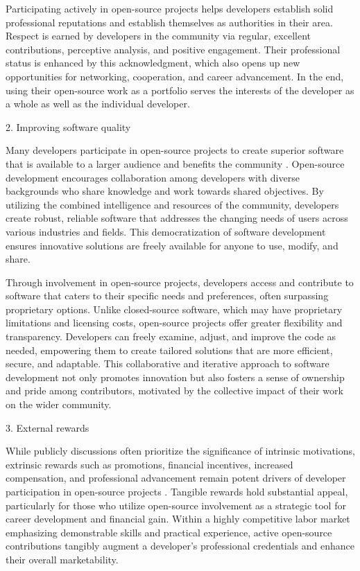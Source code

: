 Participating actively in open-source projects helps developers establish solid professional reputations and establish themselves as authorities in their area. Respect is earned by developers in the community via regular, excellent contributions, perceptive analysis, and positive engagement. Their professional status is enhanced by this acknowledgment, which also opens up new opportunities for networking, cooperation, and career advancement. In the end, using their open-source work as a portfolio serves the interests of the developer as a whole as well as the individual developer.

2. Improving software quality


Many developers participate in open-source projects to create superior software that is available to a larger audience and benefits the community \citep{13li2012leadership,15roberts2006understanding}. Open-source development encourages collaboration among developers with diverse backgrounds who share knowledge and work towards shared objectives. By utilizing the combined intelligence and resources of the community, developers create robust, reliable software that addresses the changing needs of users across various industries and fields. This democratization of software development ensures innovative solutions are freely available for anyone to use, modify, and share.

Through involvement in open-source projects, developers access and contribute to software that caters to their specific needs and preferences, often surpassing proprietary options. Unlike closed-source software, which may have proprietary limitations and licensing costs, open-source projects offer greater flexibility and transparency. Developers can freely examine, adjust, and improve the code as needed, empowering them to create tailored solutions that are more efficient, secure, and adaptable. This collaborative and iterative approach to software development not only promotes innovation but also fosters a sense of ownership and pride among contributors, motivated by the collective impact of their work on the wider community.


3. External rewards

While publicly discussions often prioritize the significance of intrinsic motivations, extrinsic rewards such as promotions, financial incentives, increased compensation, and professional advancement remain potent drivers of developer participation in open-source projects \citep{05bitzer2007intrinsic,06ye2003toward,07zhao2024openrank,11gerosa2021shifting,13li2012leadership,15roberts2006understanding,17alexander2002working,18oreg2008exploring}. Tangible rewards hold substantial appeal, particularly for those who utilize open-source involvement as a strategic tool for career development and financial gain. Within a highly competitive labor market emphasizing demonstrable skills and practical experience, active open-source contributions tangibly augment a developer's professional credentials and enhance their overall marketability.

